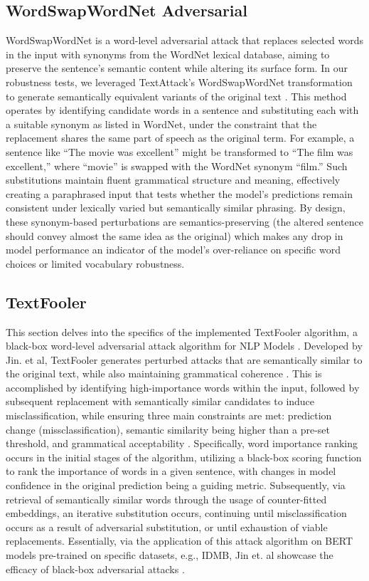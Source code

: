 \documentclass[conference]{IEEEtran}
\begin{document}
\subsection{WordSwapWordNet Adversarial}

WordSwapWordNet is a word-level adversarial attack that replaces selected words in the input with synonyms from the WordNet lexical database, aiming to preserve the sentence’s semantic content while altering its surface form. In our robustness tests, we leveraged TextAttack’s WordSwapWordNet transformation to generate semantically equivalent variants of the original text \cite{textattack2020framework}. This method operates by identifying candidate words in a sentence and substituting each with a suitable synonym as listed in WordNet, under the constraint that the replacement shares the same part of speech as the original term. For example, a sentence like “The movie was excellent” might be transformed to “The film was excellent,” where “movie” is swapped with the WordNet synonym “film.” Such substitutions maintain fluent grammatical structure and meaning, effectively creating a paraphrased input that tests whether the model’s predictions remain consistent under lexically varied but semantically similar phrasing. By design, these synonym-based perturbations are semantics-preserving (the altered sentence should convey almost the same idea as the original) which makes any drop in model performance an indicator of the model’s over-reliance on specific word choices or limited vocabulary robustness.

\subsection{TextFooler}

This section delves into the specifics of the implemented TextFooler algorithm, a black-box word-level adversarial attack algorithm for NLP Models \cite{jin2020bertrobust}. Developed by Jin. et al, TextFooler generates perturbed attacks that are semantically similar to the original text, while also maintaining grammatical coherence \cite{jin2020bertrobust}. This is accomplished by identifying high-importance words within the input, followed by subsequent replacement with semantically similar candidates to induce misclassification, while ensuring three main constraints are met: prediction change (missclassification), semantic similarity being higher than a pre-set threshold, and grammatical acceptability \cite{jin2020bertrobust} \cite{textattack2020framework}. Specifically, word importance ranking occurs in the initial stages of the algorithm, utilizing a black-box scoring function to rank the importance of words in a given sentence, with changes in model confidence in the original prediction being a guiding metric. Subsequently, via retrieval of semantically similar words through the usage of counter-fitted embeddings, an iterative substitution occurs, continuing until misclassification occurs as a result of adversarial substitution, or until exhaustion of viable replacements. Essentially, via the application of this attack algorithm on BERT models pre-trained on specific datasets, e.g., IDMB, Jin et. al showcase the efficacy of black-box adversarial attacks \cite{jin2020bertrobust, mrksic2016counterfitting}.
\end{document}
